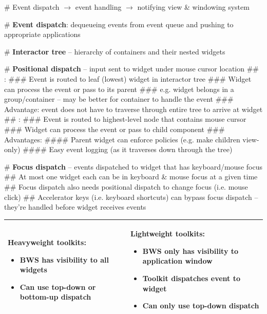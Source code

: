 \documentclass[11pt, oneside]{article}
\newcommand*{\un}[1]{\underline{\smash{#1}}}        %
\newenvironment{itemized}{\begin{itemize}[noitemsep, topsep=0pt, leftmargin=*]}{\end{itemize}}  %
\begin{document}
# Event dispatch $\rightarrow$ event handling $\rightarrow$ notifying view \& windowing system

# \textbf{Event dispatch}: dequeueing events from event queue and pushing to appropriate applications

# \textbf{Interactor tree} -- hierarchy of containers and their nested widgets

# \textbf{Positional dispatch} -- input sent to widget under mouse cursor location
## \un{Bottom-up dispatch}:
### Event is routed to leaf (lowest) widget in interactor tree
### Widget can process the event or pass to its parent
### e.g. widget belongs in a group/container -- may be better for container to handle the event
### Advantage: event does not have to traverse through entire tree to arrive at widget
## \un{Top-down dispatch}:
### Event is routed to highest-level node that contains mouse cursor
### Widget can process the event or pass to child component
### Advantages:
#### Parent widget can enforce policies (e.g. make children view-only)
#### Easy event logging (as it traverses down through the tree)

# \textbf{Focus dispatch} -- events dispatched to widget that has keyboard/mouse focus
## At most one widget each can be in keyboard \& mouse focus at a given time
## Focus dispatch also needs positional dispatch to change focus (i.e. mouse click)
## Accelerator keys (i.e. keyboard shortcuts) can bypass focus dispatch -- they're handled before widget receives events

\hspace{-2em}
\begin{tabular}{|l|l|}
\hline
\begin{minipage}[t]{0.45\textwidth}
\textbf{Heavyweight toolkits}:
    \begin{itemized}
    \item BWS has visibility to all widgets
    \item Can use top-down or bottom-up dispatch
    \end{itemized}
    \vspace*{0.5em}
\end{minipage}
&
\begin{minipage}[t]{0.45\textwidth}
\textbf{Lightweight toolkits}:
    \begin{itemized}
    \item BWS only has visibility to application window
    \item Toolkit dispatches event to widget
    \item Can only use top-down dispatch
    \end{itemized}
    \vspace*{0.5em}
\end{minipage}  \\
\hline
\end{tabular} \\
\end{document}
